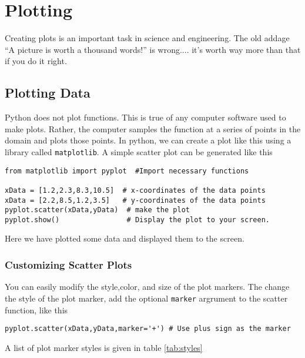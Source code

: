 \chapter{Plotting}
\label{chap:Plotting}

Creating plots is an important task in science and engineering.  The
old addage ``A picture is worth a thousand words!'' is wrong.... it's
worth way more than that if you do it right.  
\section{Plotting Data}
Python does not plot functions.  This is true of any computer
software used to make plots.  Rather, the computer samples the
function at a series of points in the domain and plots those points.
In python, we can create a plot like this using a library called
\texttt{matplotlib}.  A simple scatter plot can be generated like this

\begin{Verbatim} 
from matplotlib import pyplot  #Import necessary functions

xData = [1.2,2.3,8.3,10.5]  # x-coordinates of the data points
xData = [2.2,8.5,1.2,3.5]   # y-coordinates of the data points
pyplot.scatter(xData,yData)  # make the plot
pyplot.show()                # Display the plot to your screen.
\end{Verbatim} 
Here we have plotted some data and displayed them to the screen.
\subsection*{Customizing Scatter Plots}
You can easily modify the style,color, and size of the plot markers.
The change the style of the plot marker, add the optional
\texttt{marker} argrument to the scatter function, like this
\begin{Verbatim} 
pyplot.scatter(xData,yData,marker='+') # Use plus sign as the marker  
\end{Verbatim} 
A list of plot marker styles is given in table \ref{tab:styles}


